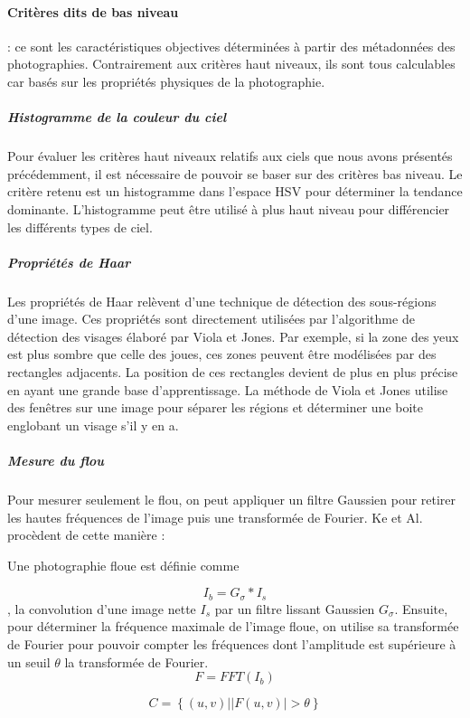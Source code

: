 \documentclass[11pt, french]{report-rd-info}
\begin{document}
\paragraph{Critères dits de bas niveau} : ce sont les caractéristiques objectives déterminées à partir des métadonnées des photographies. Contrairement aux critères haut niveaux, ils sont tous calculables car basés sur les propriétés physiques de la photographie.
\subparagraph{Histogramme de la couleur du ciel}
Pour évaluer les critères haut niveaux relatifs aux ciels que nous avons présentés précédemment, il est nécessaire de pouvoir se baser sur des critères bas niveau. Le critère retenu est un histogramme dans l’espace HSV pour déterminer la tendance dominante. L’histogramme peut être utilisé à plus haut niveau pour différencier les différents types de ciel.
\subparagraph{Propriétés de Haar}
Les propriétés de Haar relèvent d’une technique de détection des sous-régions d’une image. Ces propriétés sont directement utilisées par l’algorithme de détection des visages élaboré par Viola et Jones. Par exemple, si la zone des yeux est plus sombre que celle des joues, ces zones peuvent être modélisées par des rectangles adjacents. La position de ces rectangles devient de plus en plus précise en ayant une grande base d’apprentissage. La méthode de Viola et Jones utilise des fenêtres sur une image pour séparer les régions et déterminer une boite englobant un visage s’il y en a.
\subparagraph{Mesure du flou}
Pour mesurer seulement le flou, on peut appliquer un filtre Gaussien pour retirer les hautes fréquences de l’image puis une transformée de Fourier. Ke et Al.\cite{Ke} procèdent de cette manière : 

Une photographie floue est définie comme

\begin{equation}
I_b = G_\sigma * I_s 
\end{equation}, la convolution d'une image nette $I_s$ par un filtre lissant Gaussien $G_\sigma$.
Ensuite, pour déterminer la fréquence maximale de l'image floue, on utilise sa transformée de Fourier pour pouvoir compter les fréquences dont l'amplitude est supérieure à un seuil $\theta$ la transformée de Fourier.
\begin{equation}
F = FFT(I_b)
\end{equation}

\begin{equation}
C = \left\{(u,v) | |F(u,v)| > \theta\right\}
\end{equation}
 
\end{document}
